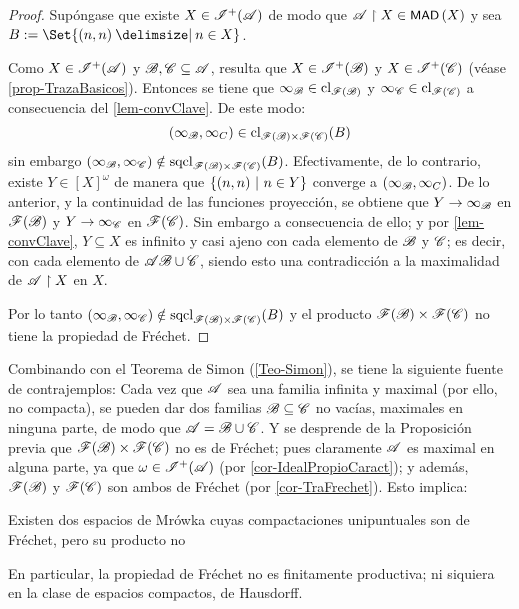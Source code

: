 	\begin{proof} 
		Supóngase que existe $X \in\mathscr{I}^+(\mathscr{A})$ de modo que $\mathscr{A} \upharpoonright X \in \operatorname{\text{\textsf{\small MAD}}}\,(X)$ y sea $B:=\Set{ (n,n) \given n \in X }$.

		Como $X \in \mathscr{I}^+(\mathscr{A})$ y $\mathscr{B},\mathscr{C} \subseteq \mathscr{A}$, resulta que $X \in \mathscr{I}^+(\mathscr{B})$ y $X \in \mathscr{I}^+(\mathscr{C})$ (véase \ref{prop-TrazaBasicos}). Entonces se tiene que $\infty_{\mathscr{B}} \in \operatorname{cl}_{\mathscr{F}(\mathscr{B})}$ y $\infty_{\mathscr{C}} \in \operatorname{cl}_{\mathscr{F}(\mathscr{C})}$ a consecuencia del \autoref{lem-convClave}. De este modo:
		$$ (\infty_{\mathscr{B}},\infty_C) \in \operatorname{cl}_{\mathscr{F}(\mathscr{B}) \times \mathscr{F}(\mathscr{C})}(B) $$
		sin embargo $(\infty_{\mathscr{B}},\infty_{\mathscr{C}}) \notin \operatorname{sqcl}_{\mathscr{F}(\mathscr{B}) \times \mathscr{F}(\mathscr{C})}(B)$. Efectivamente, de lo contrario, existe $Y \in [X]^\omega$ de manera que $\{(n,n) \text{ $|$ } n \in Y\}$ converge a $ (\infty_{\mathscr{B}},\infty_C)$. De lo anterior, y la continuidad de las funciones proyección, se obtiene que $Y \to \infty_{\mathscr{B}}$ en $\mathscr{F}(\mathscr{B})$ y $Y \to \infty_{\mathscr{C}}$ en $\mathscr{F}(\mathscr{C})$. Sin embargo a consecuencia de ello; y por \ref{lem-convClave}, $Y \subseteq X$ es infinito y casi ajeno con cada elemento de $\mathscr{B}$ y $\mathscr{C}$; es decir, con cada elemento de $\mathscr{A}\mathscr{B} \cup \mathscr{C}$, siendo esto una contradicción a la maximalidad de $\mathscr{A} \upharpoonright X$ en $X$.

		Por lo tanto $(\infty_{\mathscr{B}},\infty_{\mathscr{C}}) \notin \operatorname{sqcl}_{\mathscr{F}(\mathscr{B}) \times \mathscr{F}(\mathscr{C})}(B)$ y el producto $\mathscr{F}(\mathscr{B}) \times \mathscr{F}(\mathscr{C})$ no tiene la propiedad de Fréchet.
	\end{proof}
	
	Combinando con el Teorema de Simon (\ref{Teo-Simon}), se tiene la siguiente fuente de contrajemplos: Cada vez que $\mathscr{A}$ sea una familia infinita y maximal (por ello, no compacta), se pueden dar dos familias $\mathscr{B} \subseteq \mathscr{C}$ no vacías, maximales en ninguna parte, de modo que $\mathscr{A}=\mathscr{B} \cup \mathscr{C}$. Y se desprende de la Proposición previa que $\mathscr{F}(\mathscr{B}) \times \mathscr{F}(\mathscr{C})$ no es de Fréchet; pues claramente $\mathscr{A}$ es maximal en alguna parte, ya que $\omega \in \mathscr{I}^+(\mathscr{A})$ (por \ref{cor-IdealPropioCaract}); y además, $\mathscr{F}(\mathscr{B})$ y $\mathscr{F}(\mathscr{C})$ son ambos de Fréchet (por \ref{cor-TraFrechet}). Esto implica:

	\begin{corolario}\label{cor-FrechNoProd}
		Existen dos espacios de Mrówka cuyas compactaciones unipuntuales son de Fréchet, pero su producto no

		En particular, la propiedad de Fréchet no es finitamente productiva; ni siquiera en la clase de espacios compactos, de Hausdorff.
	\end{corolario}

